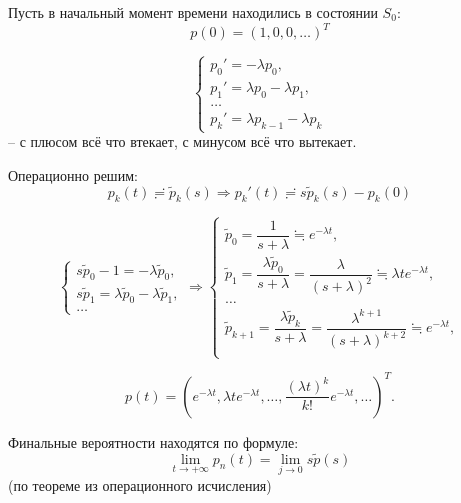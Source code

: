 \begin{ex}
  Пусть в начальный момент времени находились в состоянии $S_0$:
  \[
    p(0) = (1, 0, 0, \dots)^T
  \]


  \[
    \begin{cases}
      p_0' = -\lambda p_0, \\
      p_1' = \lambda p_0 - \lambda p_1, \\
      \dots \\
      p_k' = \lambda p_{k-1} - \lambda p_k
    \end{cases}
  \]
  -- с плюсом всё что втекает, с минусом всё что вытекает.

  Операционно решим:
  \[
    p_k(t) \risingdotseq \tilde p_k(s) 
    \Rightarrow
    p_k'(t) \risingdotseq s \tilde p_k(s) - p_k(0)
  \]

  \[
    \begin{cases}
      s \tilde p_0 - 1 = - \lambda \tilde p_0, \\
      s \tilde p_1 = \lambda \tilde p_0 - \lambda \tilde p_1, \\
      \dots
      
    \end{cases}
    \Rightarrow
    \begin{cases}
      \tilde p_0 = \dfrac{1}{s+\lambda} \fallingdotseq e^{-\lambda t}, \\
      \tilde p_1 = \dfrac{\lambda \tilde p_0}{s+\lambda} = \dfrac{\lambda}{(s+\lambda)^2}
        \fallingdotseq \lambda t e^{-\lambda t}, \\
      \dots \\
      \tilde p_{k+1} = \dfrac{\lambda \tilde p_k}{s+\lambda}=\dfrac{\lambda^{k+1}}{(s+\lambda)^{k+2}}
        \fallingdotseq e^{-\lambda t}, \\

    \end{cases}
  \]

  \[
    p(t) = \left( e^{-\lambda t}, \lambda t e^{-\lambda t}, \dots, \dfrac{(\lambda t)^k}{k!} e^{-\lambda t}, \dots \right)^T.
  \]
\end{ex}

Финальные вероятности находятся по формуле:
\[
  \lim_{t\to +\infty} p_n(t) = \lim_{j \to 0} s \tilde p(s)
\]
(по теореме из операционного исчисления)
